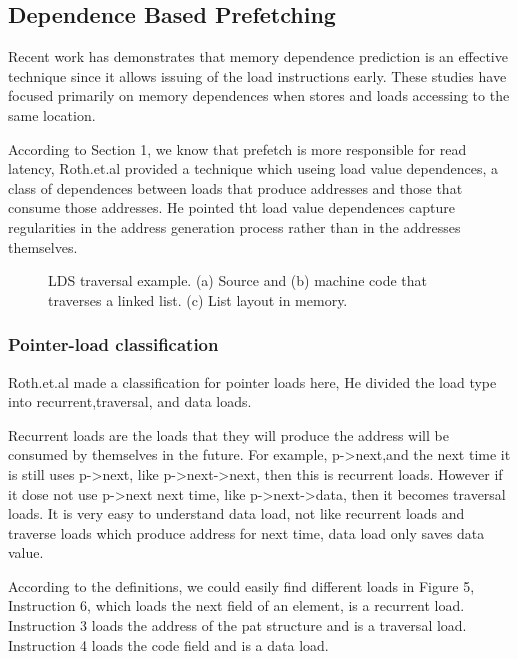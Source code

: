 \documentclass{acm_proc_article-sp}
\begin{document}
\subsection{Dependence Based Prefetching}

Recent work \cite{Onder:2002:CEM:645989.674303} has
demonstrates that memory dependence prediction is an effective technique
since it allows issuing of the load instructions early.
These studies have focused primarily on memory dependences when
stores and loads accessing to the same location. 

According to Section 1, we know that prefetch is more responsible for
read latency, Roth.et.al provided a technique which useing load value
dependences, a 
class of dependences between loads that produce addresses and those that consume
those addresses. He pointed tht load value dependences capture 
regularities in the address generation process rather than in the
addresses themselves.\cite{Roth:1998:DBP:384265.291034}

\begin{figure}
\centering
{}
\caption{LDS traversal example. (a) Source and (b) machine
code that traverses a linked list. (c) List layout in memory.}
\end{figure}

\subsubsection{Pointer-load classification}
Roth.et.al made a classification for pointer loads
here,\cite{Roth:1998:DBP:384265.291034} He divided 
the load type into recurrent,traversal, and data loads. 

Recurrent loads are the loads that they will produce the address
will be consumed by themselves in the future. For example, p->next,and
the next time it is still uses p->next, like p->next->next, then this
is recurrent loads. However if it dose not use p->next next time, like
p->next->data, then it becomes traversal loads. It is very easy to
understand data load, not like recurrent loads and traverse loads
which produce address for next time, data load only saves data value. 

According to the definitions, we could easily find different loads in
Figure 5, Instruction 6, which loads the next field of an element,
is a recurrent load. Instruction 3 loads the address of the pat
structure and is a traversal load. Instruction 4 loads the code field and
is a data load. 
\end{document}
